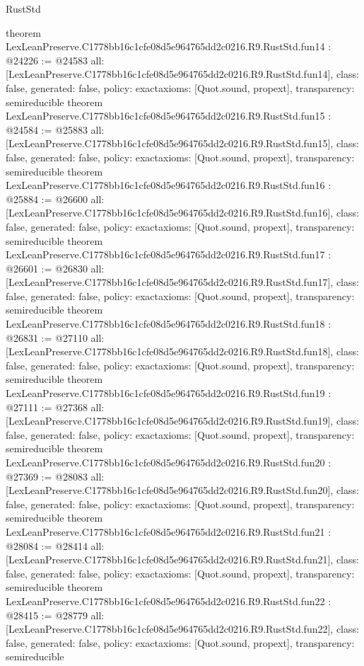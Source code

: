 \begin{lexlean}{RustStd}
\begin{coremodule}
{}
theorem LexLeanPreserve.C1778bb16c1cfe08d5e964765dd2c0216.R9.RustStd.fun14 : @24226 := @24583 {
  all: [LexLeanPreserve.C1778bb16c1cfe08d5e964765dd2c0216.R9.RustStd.fun14],
  class: false,
  generated: false,
  policy: exact{axioms: [Quot.sound, propext]},
  transparency: semireducible
}
theorem LexLeanPreserve.C1778bb16c1cfe08d5e964765dd2c0216.R9.RustStd.fun15 : @24584 := @25883 {
  all: [LexLeanPreserve.C1778bb16c1cfe08d5e964765dd2c0216.R9.RustStd.fun15],
  class: false,
  generated: false,
  policy: exact{axioms: [Quot.sound, propext]},
  transparency: semireducible
}
theorem LexLeanPreserve.C1778bb16c1cfe08d5e964765dd2c0216.R9.RustStd.fun16 : @25884 := @26600 {
  all: [LexLeanPreserve.C1778bb16c1cfe08d5e964765dd2c0216.R9.RustStd.fun16],
  class: false,
  generated: false,
  policy: exact{axioms: [Quot.sound, propext]},
  transparency: semireducible
}
theorem LexLeanPreserve.C1778bb16c1cfe08d5e964765dd2c0216.R9.RustStd.fun17 : @26601 := @26830 {
  all: [LexLeanPreserve.C1778bb16c1cfe08d5e964765dd2c0216.R9.RustStd.fun17],
  class: false,
  generated: false,
  policy: exact{axioms: [Quot.sound, propext]},
  transparency: semireducible
}
theorem LexLeanPreserve.C1778bb16c1cfe08d5e964765dd2c0216.R9.RustStd.fun18 : @26831 := @27110 {
  all: [LexLeanPreserve.C1778bb16c1cfe08d5e964765dd2c0216.R9.RustStd.fun18],
  class: false,
  generated: false,
  policy: exact{axioms: [Quot.sound, propext]},
  transparency: semireducible
}
theorem LexLeanPreserve.C1778bb16c1cfe08d5e964765dd2c0216.R9.RustStd.fun19 : @27111 := @27368 {
  all: [LexLeanPreserve.C1778bb16c1cfe08d5e964765dd2c0216.R9.RustStd.fun19],
  class: false,
  generated: false,
  policy: exact{axioms: [Quot.sound, propext]},
  transparency: semireducible
}
theorem LexLeanPreserve.C1778bb16c1cfe08d5e964765dd2c0216.R9.RustStd.fun20 : @27369 := @28083 {
  all: [LexLeanPreserve.C1778bb16c1cfe08d5e964765dd2c0216.R9.RustStd.fun20],
  class: false,
  generated: false,
  policy: exact{axioms: [Quot.sound, propext]},
  transparency: semireducible
}
theorem LexLeanPreserve.C1778bb16c1cfe08d5e964765dd2c0216.R9.RustStd.fun21 : @28084 := @28414 {
  all: [LexLeanPreserve.C1778bb16c1cfe08d5e964765dd2c0216.R9.RustStd.fun21],
  class: false,
  generated: false,
  policy: exact{axioms: [Quot.sound, propext]},
  transparency: semireducible
}
theorem LexLeanPreserve.C1778bb16c1cfe08d5e964765dd2c0216.R9.RustStd.fun22 : @28415 := @28779 {
  all: [LexLeanPreserve.C1778bb16c1cfe08d5e964765dd2c0216.R9.RustStd.fun22],
  class: false,
  generated: false,
  policy: exact{axioms: [Quot.sound, propext]},
  transparency: semireducible
}
\end{coremodule}
\end{lexlean}
